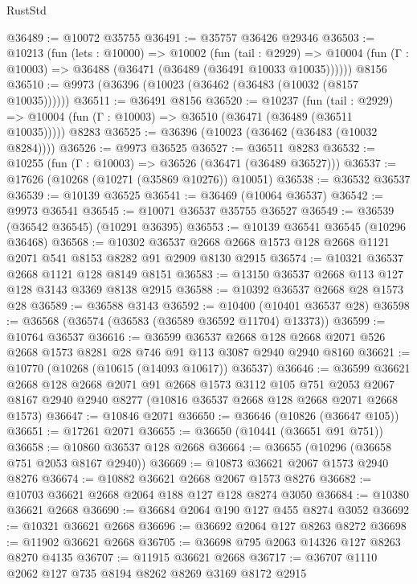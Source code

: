 \begin{lexlean}{RustStd}
\begin{coremodule}
@36489 := @10072 @35755
@36491 := @35757 @36426 @29346
@36503 := @10213
    (fun (lets : @10000) =>
    @10002
      (fun (tail : @2929) =>
      @10004 (fun (Γ : @10003) => @36488 (@36471 (@36489 (@36491 @10033 @10035))))))
    @8156
@36510 := @9973 (@36396 (@10023 (@36462 (@36483 (@10032 (@8157 @10035))))))
@36511 := @36491 @8156
@36520 := @10237
    (fun (tail : @2929) => @10004 (fun (Γ : @10003) => @36510 (@36471 (@36489 (@36511 @10035)))))
    @8283
@36525 := @36396 (@10023 (@36462 (@36483 (@10032 @8284))))
@36526 := @9973 @36525
@36527 := @36511 @8283
@36532 := @10255 (fun (Γ : @10003) => @36526 (@36471 (@36489 @36527)))
@36537 := @17626 (@10268 (@10271 (@35869 @10276)) @10051)
@36538 := @36532 @36537
@36539 := @10139 @36525
@36541 := @36469 (@10064 @36537)
@36542 := @9973 @36541
@36545 := @10071 @36537 @35755 @36527
@36549 := @36539 (@36542 @36545) (@10291 @36395)
@36553 := @10139 @36541 @36545 (@10296 @36468)
@36568 := @10302
    @36537
    @2668
    @2668
    @1573
    @128
    @2668
    @1121
    @2071
    @541
    @8153
    @8282
    @91
    @2909
    @8130
    @2915
@36574 := @10321 @36537 @2668 @1121 @128 @8149 @8151
@36583 := @13150 @36537 @2668 @113 @127 @128 @3143 @3369 @8138 @2915
@36588 := @10392 @36537 @2668 @28 @1573 @28
@36589 := @36588 @3143
@36592 := @10400 (@10401 @36537 @28)
@36598 := @36568 (@36574 (@36583 (@36589 @36592 @11704) @13373))
@36599 := @10764 @36537
@36616 := @36599
    @36537
    @2668
    @128
    @2668
    @2071
    @526
    @2668
    @1573
    @8281
    @28
    @746
    @91
    @113
    @3087
    @2940
    @2940
    @8160
@36621 := @10770 (@10268 (@10615 (@14093 @10617)) @36537)
@36646 := @36599
    @36621
    @2668
    @128
    @2668
    @2071
    @91
    @2668
    @1573
    @3112
    @105
    @751
    @2053
    @2067
    @8167
    @2940
    @2940
    @8277
    (@10816 @36537 @2668 @128 @2668 @2071 @2668 @1573)
@36647 := @10846 @2071
@36650 := @36646 (@10826 (@36647 @105))
@36651 := @17261 @2071
@36655 := @36650 (@10441 (@36651 @91 @751))
@36658 := @10860 @36537 @128 @2668
@36664 := @36655 (@10296 (@36658 @751 @2053 @8167 @2940))
@36669 := @10873 @36621 @2067 @1573 @2940 @8276
@36674 := @10882 @36621 @2668 @2067 @1573 @8276
@36682 := @10703 @36621 @2668 @2064 @188 @127 @128 @8274 @3050
@36684 := @10380 @36621 @2668
@36690 := @36684 @2064 @190 @127 @455 @8274 @3052
@36692 := @10321 @36621 @2668
@36696 := @36692 @2064 @127 @8263 @8272
@36698 := @11902 @36621 @2668
@36705 := @36698 @795 @2063 @14326 @127 @8263 @8270 @4135
@36707 := @11915 @36621 @2668
@36717 := @36707 @1110 @2062 @127 @735 @8194 @8262 @8269 @3169 @8172 @2915

\end{coremodule}
\end{lexlean}
